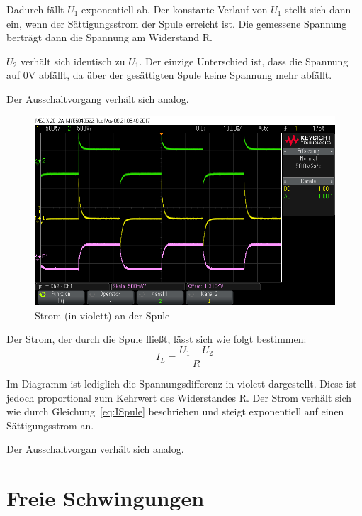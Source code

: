 \documentclass[10pt]{scrreprt}
\begin{document}
        Dadurch fällt $U_1$ exponentiell ab. Der konstante Verlauf von $U_1$ stellt sich
        dann ein, wenn der Sättigungsstrom der Spule erreicht ist. Die gemessene Spannung
        berträgt dann die Spannung am Widerstand R.

        $U_2$ verhält sich identisch zu $U_1$. Der einzige Unterschied ist, dass die Spannung
        auf $0\si{\volt}$ abfällt, da über der gesättigten Spule keine Spannung mehr abfällt.

        Der Ausschaltvorgang verhält sich analog.
        \begin{center}
            \begin{figure}[H]
                \includegraphics[width=\textwidth]{scope_3.png}
                \caption{Strom (in violett) an der Spule}
            \end{figure}
        \end{center}

        Der Strom, der durch die Spule fließt, lässt sich wie folgt bestimmen:
        \begin{equation}
            I_L = \frac{U_1 - U_2}{R}
        \end{equation}

        Im Diagramm ist lediglich die Spannungsdifferenz in violett dargestellt. Diese
        ist jedoch proportional zum Kehrwert des Widerstandes R. Der Strom verhält sich
        wie durch Gleichung~\ref{eq:ISpule} beschrieben und steigt exponentiell auf einen Sättigungsstrom
        an.

        Der Ausschaltvorgan verhält sich analog.


        \section{Freie Schwingungen}
\end{document}

